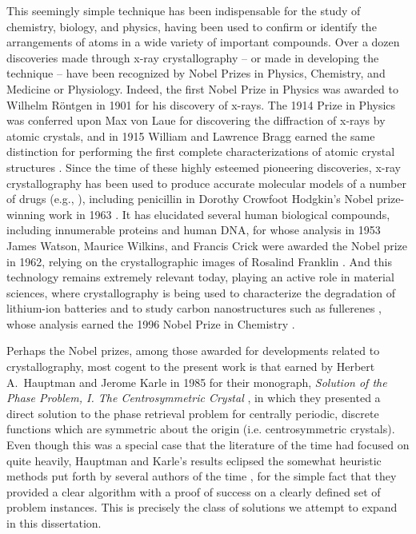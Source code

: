 This seemingly simple technique has been indispensable for the study of chemistry, biology, and physics, having been used to confirm or identify the arrangements of atoms in a wide variety of important compounds.  Over a dozen discoveries made through x-ray crystallography -- or made in developing the technique -- have been recognized by Nobel Prizes in Physics, Chemistry, and Medicine or Physiology.  Indeed, the first Nobel Prize in Physics was awarded to Wilhelm R\"ontgen in 1901 for his discovery of x-rays.  The 1914 Prize in Physics was conferred upon Max von Laue for discovering the diffraction of x-rays by atomic crystals, and in 1915 William and Lawrence Bragg earned the same distinction for performing the first complete characterizations of atomic crystal structures \cite{galli2014nobel}.  Since the time of these highly esteemed pioneering discoveries, x-ray crystallography has been used to produce accurate molecular models of a number of drugs (e.g., \cite{cell2001antibios, rasmussen2007adrenergic, schindler2000kinase}), including penicillin in Dorothy Crowfoot Hodgkin's Nobel prize-winning work in 1963 \cite{hodgkin1963penicillin}.  It has elucidated several human biological compounds, including innumerable proteins \cite{kimber2003protein, varsani1993isomerase} and human DNA, for whose analysis in 1953 James Watson, Maurice Wilkins, and Francis Crick were awarded the Nobel prize in 1962, relying on the crystallographic images of Rosalind Franklin \cite{franklin1953nature,watson1962nobel_lecture,watson1953nature,wilkins1953nature}.  And this technology remains extremely relevant today, playing an active role in material sciences, where crystallography is being used to characterize the degradation of lithium-ion batteries \cite{hausbrand2015battery, andrej2018battery} and to study carbon nanostructures such as fullerenes \cite{lamb1990carbon, kroto1985fullerene}, whose analysis earned the 1996 Nobel Prize in Chemistry \cite{galli2014nobel}.

Perhaps the Nobel prizes, among those awarded for developments related to crystallography, most cogent to the present work is that earned by Herbert A.~Hauptman and Jerome Karle in 1985 for their monograph, \emph{Solution of the Phase Problem, I.  The Centrosymmetric Crystal} \cite{hauptman1953monograph}, in which they presented a direct solution to the phase retrieval problem for centrally periodic, discrete functions which are symmetric about the origin (i.e. centrosymmetric crystals).  Even though this was a special case that the literature of the time had focused on quite heavily, Hauptman and Karle's results eclipsed the somewhat heuristic methods put forth by several authors of the time \cite{harker1948phases,sayre1952shannon}, for the simple fact that they provided a clear algorithm with a proof of success on a clearly defined set of problem instances.  This is precisely the class of solutions we attempt to expand in this dissertation.
